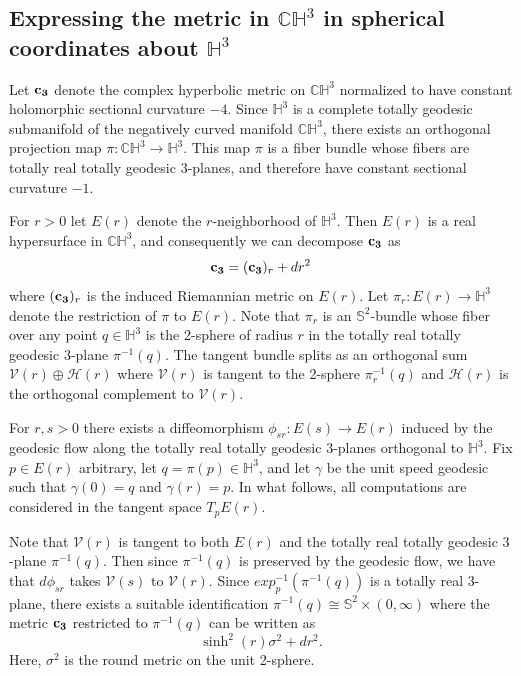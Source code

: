 \documentclass[10pt]{amsart}
\def\s{\sigma}
\def\V{\mathcal{V}}
\def\S{\mathcal{S}}
\def\g{\gamma}
\def\H{\mathbb{H}}
\def\C{\mathbb{C}}
\def\S{\mathbb{S}}
\theoremstyle{definition}
\theoremstyle{remark}
\numberwithin{equation}{section}
\begin{document}
\subsection{Expressing the metric in $\C \H^3$ in spherical coordinates about $\H^3$}
Let ${\bf c_3}$ denote the complex hyperbolic metric on $\C \H^3$ normalized to have constant holomorphic sectional curvature $-4$.  
Since $\H^3$ is a complete totally geodesic submanifold of the negatively curved manifold $\C \H^3$, there exists an orthogonal projection map $\pi : \C \H^3 \to \H^3$.  
This map $\pi$ is a fiber bundle whose fibers are totally real totally geodesic $3$-planes, and therefore have constant sectional curvature $-1$.  

For $r > 0$ let $E(r)$ denote the $r$-neighborhood of $\H^3$.  
Then $E(r)$ is a real hypersurface in $\C \H^3$, and consequently we can decompose ${\bf c_3}$ as
	\begin{equation*}
	{\bf c_3} = ({\bf c_3})_r + dr^2
	\end{equation*}
where $({\bf c_3})_r$ is the induced Riemannian metric on $E(r)$.  
Let $\pi_r : E(r) \to \H^3$ denote the restriction of $\pi$ to $E(r)$.  
Note that $\pi_r$ is an $\S^2$-bundle whose fiber over any point $q \in \H^3$ is the 2-sphere of radius $r$ in the totally real totally geodesic $3$-plane $\pi^{-1}(q)$.  
The tangent bundle splits as an orthogonal sum $\mathcal{V}(r) \oplus \mathcal{H}(r)$ where $\mathcal{V}(r)$ is tangent to the 2-sphere $\pi_r^{-1}(q)$ and $\mathcal{H}(r)$ is the orthogonal complement to $\mathcal{V}(r)$.

For $r, s > 0$ there exists a diffeomorphism $\phi_{sr}: E(s) \to E(r)$ induced by the geodesic flow along the totally real totally geodesic $3$-planes orthogonal to $\H^3$.   
Fix $p \in E(r)$ arbitrary, let $q = \pi(p) \in \H^3$, and let $\g$ be the unit speed geodesic such that $\g(0) = q$ and $\g(r) = p$. 
In what follows, all computations are considered in the tangent space $T_p E(r)$. 

Note that $\V(r)$ is tangent to both $E(r)$ and the totally real totally geodesic $3$-plane $\pi^{-1}(q)$.  
Then since $\pi^{-1}(q)$ is preserved by the geodesic flow, we have that $d \phi_{sr}$ takes $\V(s)$ to $\V(r)$.  
Since $exp_p^{-1} \left( \pi^{-1}(q) \right)$ is a totally real 3-plane, there exists a suitable identification $\pi^{-1}(q) \cong \S^2 \times (0,\infty)$ where the metric ${\bf c_3}$ restricted to $\pi^{-1}(q)$ can be written as 
	\begin{equation*}
	\sinh^2(r) \s^2 + dr^2.
	\end{equation*}
Here, $\s^2$ is the round metric on the unit 2-sphere.
\end{document}

